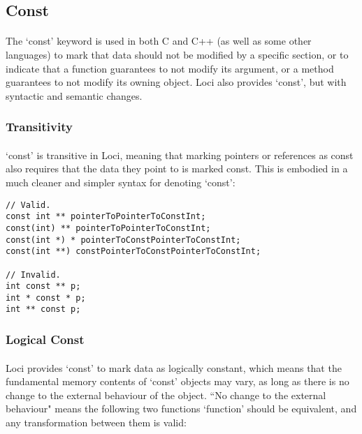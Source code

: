 \documentclass[12pt,twoside,notitlepage]{report}
\begin{document}
\clearpage

\subsection{Const}

\paragraph{}
The `const' keyword is used in both C and C++ (as well as some other languages) to mark that data should not be modified by a specific section, or to indicate that a function guarantees to not modify its argument, or a method guarantees to not modify its owning object. Loci also provides `const', but with syntactic and semantic changes.

\subsubsection{Transitivity}

\paragraph{}
`const' is transitive in Loci, meaning that marking pointers or references as const also requires that the data they point to is marked const. This is embodied in a much cleaner and simpler syntax for denoting `const':

\begin{lstlisting}
// Valid.
const int ** pointerToPointerToConstInt;
const(int) ** pointerToPointerToConstInt;
const(int *) * pointerToConstPointerToConstInt;
const(int **) constPointerToConstPointerToConstInt;

// Invalid.
int const ** p;
int * const * p;
int ** const p;
\end{lstlisting}

\subsubsection{Logical Const}

\paragraph{}
Loci provides `const' to mark data as logically constant, which means that the fundamental memory contents of `const' objects may vary, as long as there is no change to the external behaviour of the object. ``No change to the external behaviour" means the following two functions `function' should be equivalent, and any transformation between them is valid:
\end{document}
